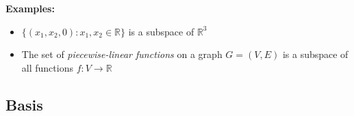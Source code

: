 \textbf{Examples:}
\medskip

\begin{itemize}
	\item $\{ (x_1, x_2, 0) : x_1, x_2 \in \mathbb{R}\}$ is a subspace of $\mathbb{R}^3$
	\item The set of \emph{piecewise-linear functions} on a graph $G=(V,E)$ is a subspace of all functions $f:V\to\mathbb{R}$
\end{itemize}

\subsection{Basis} 

